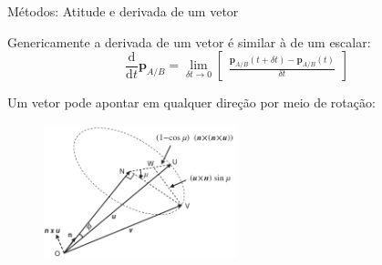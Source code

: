 \documentclass{beamer}
\begin{document}
\begin{frame}{Métodos: Atitude e derivada de um vetor}

Genericamente a derivada de um vetor é similar à de um escalar:
\begin{equation*}
    \frac{\mathrm{d}}{\mathrm{d}t} \mathbf{p}_{A/B} =  \lim_{\delta t \rightarrow 0 } \begin{bmatrix}
        \displaystyle\frac{\mathbf{p}_{A/B} (t + \delta t) - \mathbf{p}_{A/B} (t) }{\delta t}
    \end{bmatrix}
\end{equation*}

Um vetor pode apontar em qualquer direção por meio de rotação:
\begin{figure}[h]
    \centering
    \includegraphics[width=0.5\textwidth, keepaspectratio]{figuras/figure1.2-1.png}\label{fig1.2-1}
\end{figure}

\end{frame}
\end{document}
